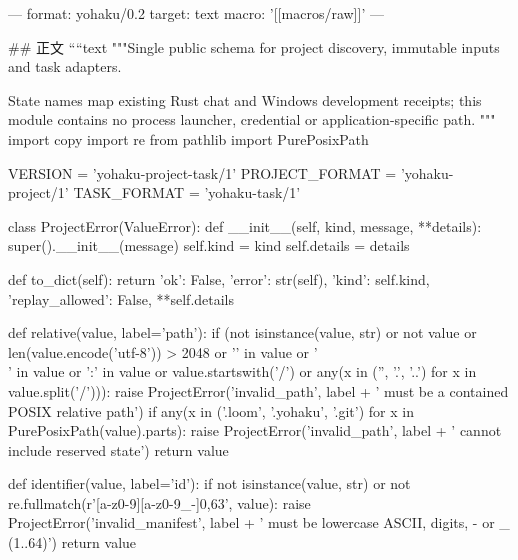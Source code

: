 ---
format: yohaku/0.2
target: text
macro: '[[macros/raw]]'
---

## 正文
````text
"""Single public schema for project discovery, immutable inputs and task adapters.

State names map existing Rust chat and Windows development receipts; this module
contains no process launcher, credential or application-specific path.
"""
import copy
import re
from pathlib import PurePosixPath

VERSION = 'yohaku-project-task/1'
PROJECT_FORMAT = 'yohaku-project/1'
TASK_FORMAT = 'yohaku-task/1'


class ProjectError(ValueError):
    def __init__(self, kind, message, **details):
        super().__init__(message)
        self.kind = kind
        self.details = details

    def to_dict(self):
        return {'ok': False, 'error': str(self), 'kind': self.kind,
                'replay_allowed': False, **self.details}


def relative(value, label='path'):
    if (not isinstance(value, str) or not value or len(value.encode('utf-8')) > 2048
            or '\0' in value or '\\' in value or ':' in value
            or value.startswith('/') or any(x in ('', '.', '..') for x in value.split('/'))):
        raise ProjectError('invalid_path', label + ' must be a contained POSIX relative path')
    if any(x in ('.loom', '.yohaku', '.git') for x in PurePosixPath(value).parts):
        raise ProjectError('invalid_path', label + ' cannot include reserved state')
    return value


def identifier(value, label='id'):
    if not isinstance(value, str) or not re.fullmatch(r'[a-z0-9][a-z0-9_-]{0,63}', value):
        raise ProjectError('invalid_manifest', label + ' must be lowercase ASCII, digits, - or _ (1..64)')
    return value


